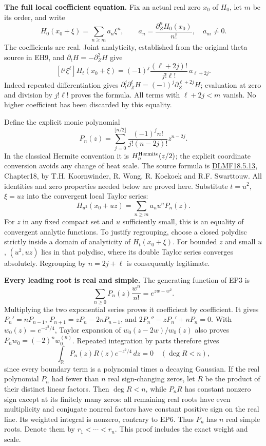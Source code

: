 \documentclass[11pt,a4paper]{article}
\theoremstyle{definition}\newtheorem{definition}[theorem]{Definition}
\begin{document}
\EP\textbf{The full local coefficient equation.}
Fix an actual real zero $x_0$ of $H_0$, let $m$ be its order, and write
\[
 H_0(x_0+\xi)=\sum_{n\ge m}a_n\xi^n,
 \qquad a_n=\frac{\partial_Z^nH_0(x_0)}{n!},\quad a_m\ne0.
 \tag{EP1}\label{ep:coefficients}
\]
The coefficients are real. Joint analyticity, established from the
original theta source in EH9, and $\partial_tH=-\partial_Z^2H$ give
\[
 [t^j\xi^\ell]H_t(x_0+\xi)
   =(-1)^j\frac{(\ell+2j)!}{j!\ell!}\,a_{\ell+2j}.
 \tag{EP2}\label{ep:heatcoeff}
\]
Indeed repeated differentiation gives
$\partial_t^j\partial_Z^\ell H=(-1)^j\partial_Z^{\ell+2j}H$;
evaluation at zero and division by $j!\ell!$ proves the formula.
All terms with $\ell+2j<m$ vanish. No higher coefficient has been
discarded by this equality.

Define the explicit monic polynomial
\[
 P_n(z)=\sum_{j=0}^{\lfloor n/2\rfloor}
          \frac{(-1)^jn!}{j!(n-2j)!}z^{n-2j}.
 \tag{EP3}\label{ep:hermite}
\]
In the classical Hermite convention it is $H_n^{\rm Hermite}(z/2)$;
the explicit coordinate conversion avoids any change of heat scale.
The source formula is \href{https://dlmf.nist.gov/18.5.E13}{DLMF18.5.13},
Chapter18, by T.H. Koornwinder, R. Wong, R. Koekoek and R.F. Swarttouw.
All identities and zero properties needed below are proved here.
Substitute $t=u^2$, $\xi=uz$ into the convergent local Taylor series:
\[
 H_{u^2}(x_0+uz)=\sum_{n\ge m}a_n u^nP_n(z).
 \tag{EP4}\label{ep:rescaled}
\]
For $z$ in any fixed compact set and $u$ sufficiently small, this is
an equality of convergent analytic functions. To justify regrouping,
choose a closed polydisc strictly inside a domain of analyticity of
$H_t(x_0+\xi)$. For bounded $z$ and small $u$, $(u^2,uz)$ lies in
that polydisc, where its double Taylor series converges absolutely.
Regrouping by $n=2j+\ell$ is consequently legitimate.

\EP\textbf{Every leading root is real and simple.}
The generating function of EP3 is
\[
 \sum_{n\ge0}P_n(z)\frac{w^n}{n!}=e^{zw-w^2}.
 \tag{EP5}
\]
Multiplying the two exponential series proves it coefficient by
coefficient. It gives $P_n'=nP_{n-1}$,
$P_{n+1}=zP_n-2nP_{n-1}$, and
$2P_n''-zP_n'+nP_n=0$.
With $w_0(z)=e^{-z^2/4}$, Taylor expansion of
$w_0(z-2w)/w_0(z)$ also proves
$P_nw_0=(-2)^nw_0^{(n)}$.
Repeated integration by parts therefore gives
\[
 \int_{\mathbb R}P_n(z)R(z)e^{-z^2/4}\,dz=0
       \quad (\deg R<n),
 \tag{EP6}
\]
since every boundary term is a polynomial times a decaying Gaussian.
If the real polynomial $P_n$ had fewer than $n$ real sign-changing
zeros, let $R$ be the product of their distinct linear factors.
Then $\deg R<n$, while $P_nR$ has constant nonzero sign except
at its finitely many zeros: all remaining real roots have even
multiplicity and conjugate nonreal factors have constant positive
sign on the real line. Its weighted integral is nonzero, contrary
to EP6. Thus $P_n$ has $n$ real simple roots. Denote them by
$r_1<\cdots<r_n$. This proof includes the exact weight and scale.
\end{document}
